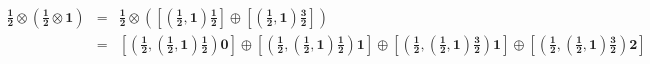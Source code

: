 \documentclass{article}
\begin{document}
{\begin{eqnarray}
\end{eqnarray}
\begin{eqnarray}
\mathbf{\frac{1}{2}} \otimes \left( \mathbf{\frac{1}{2}}  \otimes \mathbf{1} \right) 
    & = & \mathbf{\frac{1}{2} \otimes\left(\left[\left(\frac{1}{2}, 1\right) \frac{1}{2} \right] \oplus \left[\left(\frac{1}{2}, 1 \right) \frac{3}{2} \right]\right) }\nonumber\\
    & = & \mathbf{ \left[\left(\frac{1}{2}, \left(\frac{1}{2}, 1 \right) \frac{1}{2} \right) 0\right] \oplus \left[\left(\frac{1}{2}, \left(\frac{1}{2}, 1\right) \frac{1}{2} \right) 1 \right] \oplus \left[\left( \frac{1}{2}, \left(\frac{1}{2}, 1 \right) \frac{3}{2} \right) 1 \right] \oplus \left[\left(\frac{1}{2}, \left(\frac{1}{2}, 1 \right) \frac{3}{2} \right) 2 \right] }\nonumber
\end{eqnarray}
\appendix
}
\end{document}
